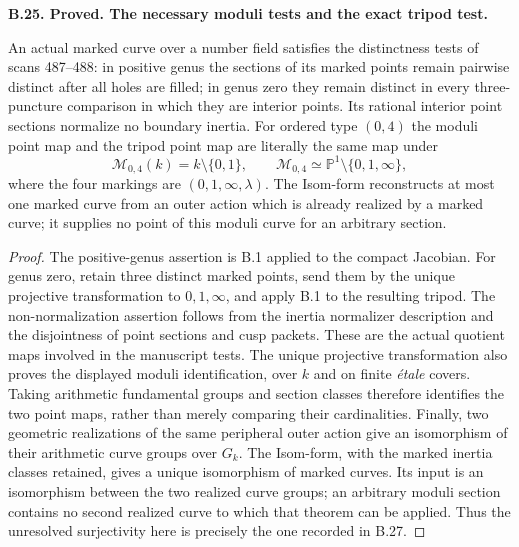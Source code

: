 \documentclass[11pt,oneside]{article}
\makeatletter
\newcounter{statementanchor}
\newenvironment{statement}[3]{%
 \refstepcounter{statementanchor}\def\@currentlabel{#1}%
 \par\addvspace{9pt}\noindent
 \textbf{#1. #2. #3.}\par\nobreak\noindent\ignorespaces
}{\par\addvspace{5pt}}
\makeatother
\begin{document}
\begin{statement}{B.25}{Proved}{The necessary moduli tests and the exact tripod test}
\label{st:B.25}

An actual marked curve over a number field satisfies the distinctness
tests of scans 487--488: in positive genus the sections of its marked
points remain pairwise distinct after all holes are filled; in genus
zero they remain distinct in every three-puncture comparison in which
they are interior points.  Its rational interior point sections
normalize no boundary inertia.  For ordered type $(0,4)$ the moduli
point map and the tripod point map are literally the same map under
\[
 \mathcal M_{0,4}(k)=k\setminus\{0,1\},\qquad
 \mathcal M_{0,4}\simeq\mathbb P^1\setminus\{0,1,\infty\},
\]
where the four markings are $(0,1,\infty,\lambda)$.
The Isom-form reconstructs at most one marked curve from an outer
action which is already realized by a marked curve; it supplies no
point of this moduli curve for an arbitrary section.
\end{statement}
\begin{proof}
The positive-genus assertion is B.1 applied to the compact Jacobian.
For genus zero, retain three distinct marked points, send them by
the unique projective transformation to $0,1,\infty$, and apply B.1
to the resulting tripod.  The non-normalization assertion follows
from the inertia normalizer description and the disjointness of
point sections and cusp packets.  These are the actual quotient
maps involved in the manuscript tests.
The unique projective transformation also proves the displayed
moduli identification, over $k$ and on finite \emph{\'etale} covers.
Taking arithmetic fundamental groups and section classes therefore
identifies the two point maps, rather than merely comparing their
cardinalities.
Finally, two geometric realizations of the same peripheral outer
action give an isomorphism of their arithmetic curve groups over
$G_k$.  The Isom-form, with the marked inertia classes retained,
gives a unique isomorphism of marked curves.  Its input is an
isomorphism between the two realized curve groups; an arbitrary
moduli section contains no second realized curve to which that
theorem can be applied.  Thus the unresolved surjectivity here is
precisely the one recorded in B.27.
\end{proof}
\end{document}
